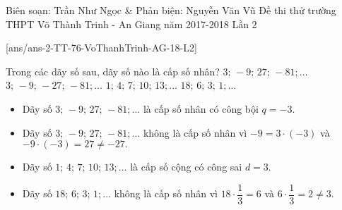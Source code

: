 \begin{name}
{Biên soạn: Trần Như Ngọc \& Phản biện: Nguyễn Văn Vũ}
{Đề thi thử trường THPT  Võ Thành Trinh - An Giang năm 2017-2018 Lần 2}
\end{name}
\setcounter{ex}{0}\setcounter{bt}{0}
[ans/ans-2-TT-76-VoThanhTrinh-AG-18-L2]
\begin{ex}%
	Trong các dãy số sau, dãy số nào là cấp số nhân?
	\choice
	{\True $3; \, -9; \, 27; \, -81;\ldots$}
	{$3; \, -9; \, - 27; \, -81;\ldots$}
	{$1; \, 4; \, 7; \, 10;\, 13;\ldots$}
	{$18; \, 6; \, 3; \, 1;\ldots$}
	\loigiai
	{
		\begin{itemize}
			\item Dãy số $3; \, -9; \, 27; \, -81;\ldots$ là cấp số nhân có công bội $ q = -3. $
			\item Dãy số $3; \, -9; \, 27; \, -81;\ldots$ không là cấp số nhân vì $ -9 = 3 \cdot (-3)$ và $ -9 \cdot (-3) = 27 \ne -27.$
			\item Dãy số $1; \, 4; \, 7; \, 10;\, 13;\ldots$ là cấp số cộng có công sai $ d = 3. $
			\item Dãy số $18; \, 6; \, 3; \, 1;\ldots$ không là cấp số nhân vì $ 18 \cdot \dfrac{1}{3} = 6 $ và $ 6 \cdot \dfrac{1}{3} = 2 \ne 3. $
		\end{itemize}
	}
\end{ex}

